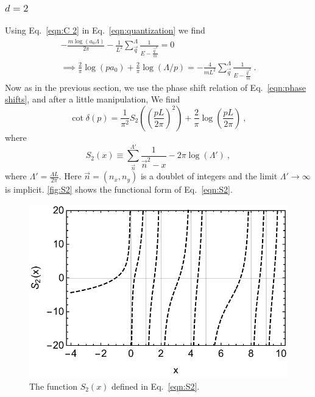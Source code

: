 \documentclass[11pt]{article}
\begin{document}
\subsubsection{$d=2$}
Using Eq.~\eqref{eqn:C 2} in Eq.~\eqref{eqn:quantization} we find
\begin{multline}
-\frac{m \log (a_0\Lambda)}{2 \pi }-\frac{1}{L^2}\sum_{\vec{q}}^\Lambda \frac { 1 } { E - \frac{\vec{q}^2}{m} }=0\\
\implies
\frac{2}{\pi}\log (pa_0)+\frac{2}{\pi}\log(\Lambda/p)=-\frac{4}{mL^2}\sum_{\vec{q}}^\Lambda \frac { 1 } { E - \frac{\vec{q}^2}{m} }\ .
\end{multline}
Now as in the previous section, we use the phase shift relation of Eq.~\eqref{eqn:phase shifts}, and after a little manipulation, We find
\begin{equation}
\cot \delta(p)=\frac{1}{\pi^2}S_2\left(\left(\frac{pL}{2\pi}\right)^2\right)+\frac{2}{\pi}\log\left(\frac{pL}{2\pi}\right)\ ,
\end{equation}
where
\begin{equation}\label{eqn:S2}
S_2(x)\equiv\sum_{\vec{n}}^{\Lambda'} \frac { 1 } { \vec{n}^2 -x}-2\pi\log\left(\Lambda'\right)\ ,
\end{equation}
where $\Lambda'=\frac{\Lambda L}{2\pi}$.
Here $\vec{n}=(n_x,n_y)$ is a doublet of integers and the limit $\Lambda'\to\infty$ is implicit.   \autoref{fig:S2} shows the functional form of Eq.~\eqref{eqn:S2}.
\begin{figure}
\center
\includegraphics[width=.8\columnwidth]{figure/S2.pdf}
\caption{The function $S_2(x)$ defined in Eq.~\eqref{eqn:S2}.\label{fig:S2}}
\end{figure}
\end{document}
